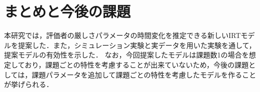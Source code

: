 \documentclass[dvipdfmx, twocolumn, a4paper]{hcresume}
\begin{document}
\section{まとめと今後の課題}
本研究では，評価者の厳しさパラメータの時間変化を推定できる新しいIRTモデルを提案した．また，シミュレーション実験と実データを用いた実験を通して，提案モデルの有効性を示した．
なお，今回提案したモデルは課題数1の場合を想定しており，課題ごとの特性を考慮することが出来ていないため，今後の課題としては，課題パラメータを追加して課題ごとの特性を考慮したモデルを作ることが挙げられる．
{\small


}
\end{document}

